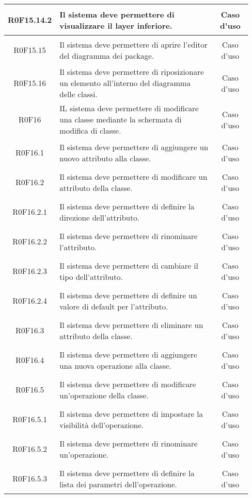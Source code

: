 \documentclass[../AnalisiDeiRequisiti.tex]{subfiles}
\begin{document}
\begin{longtable}{|c|>{\centering}p{7cm}|c|}
\hypertarget{R0F15.14.2}{R0F15.14.2} & Il sistema deve permettere di visualizzare il layer inferiore. & Caso d'uso \\ \hline
\hypertarget{R0F15.15}{R0F15.15} & Il sistema deve permettere di aprire l'editor del diagramma dei package. & Caso d'uso \\ \hline
\hypertarget{R0F15.16}{R0F15.16} & Il sistema deve permettere di riposizionare un elemento all'interno del diagramma delle classi. & Caso d'uso \\ \hline
\hypertarget{R0F16}{R0F16} & IL sistema deve permettere di modificare una classe mediante la schermata di modifica di classe. & Caso d'uso \\ \hline
\hypertarget{R0F16.1}{R0F16.1} & Il sistema deve permettere di aggiungere un nuovo attributo alla classe. & Caso d'uso \\ \hline
\hypertarget{R0F16.2}{R0F16.2} & Il sistema deve permettere di modificare un attributo della classe. & Caso d'uso \\ \hline
\hypertarget{R0F16.2.1}{R0F16.2.1} & Il sistema deve permettere di definire la direzione dell'attributo. & Caso d'uso \\ \hline
\hypertarget{R0F16.2.2}{R0F16.2.2} & Il sistema deve permettere di rinominare l'attributo. & Caso d'uso \\ \hline
\hypertarget{R0F16.2.3}{R0F16.2.3} & Il sistema deve permettere di cambiare il tipo dell'attributo. & Caso d'uso \\ \hline
\hypertarget{R0F16.2.4}{R0F16.2.4} & Il sistema deve permettere di definire un valore di default per l'attributo. & Caso d'uso \\ \hline
\hypertarget{R0F16.3}{R0F16.3} & Il sistema deve permettere di eliminare un attributo della classe. & Caso d'uso \\ \hline
\hypertarget{R0F16.4}{R0F16.4} & Il sistema deve permettere di aggiungere una nuova operazione alla classe. & Caso d'uso \\ \hline
\hypertarget{R0F16.5}{R0F16.5} & Il sistema deve permettere di modificare un'operazione della classe. & Caso d'uso \\ \hline
\hypertarget{R0F16.5.1}{R0F16.5.1} & Il sistema deve permettere di impostare la visibilità dell'operazione. & Caso d'uso \\ \hline
\hypertarget{R0F16.5.2}{R0F16.5.2} & Il sistema deve permettere di rinominare un'operazione.  & Caso d'uso \\ \hline
\hypertarget{R0F16.5.3}{R0F16.5.3} & Il sistema deve permettere di definire la lista dei parametri dell'operazione. & Caso d'uso \\ \hline

\end{longtable}
\end{document}
